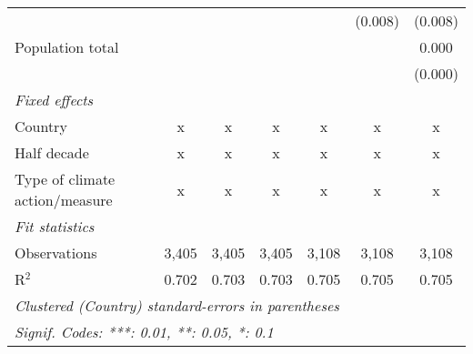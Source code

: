 \begin{tabular}{lcccccc}
                                                         &         &               &               &               & (0.008)       & (0.008)\\   
   Population total                                      &         &               &               &               &               & 0.000\\   
                                                         &         &               &               &               &               & (0.000)\\   
   \emph{Fixed effects}\\
   Country                                               & x       & x             & x             & x             & x             & x\\  
   Half decade                                           & x       & x             & x             & x             & x             & x\\  
   Type of climate action/measure                        & x       & x             & x             & x             & x             & x\\  
   \midrule \emph{Fit statistics}\\
   Observations                                          & 3,405   & 3,405         & 3,405         & 3,108         & 3,108         & 3,108\\  
   R$^2$                                                 & 0.702   & 0.703         & 0.703         & 0.705         & 0.705         & 0.705\\  
   \midrule
   \multicolumn{7}{l}{\emph{Clustered (Country) standard-errors in parentheses}}\\
   \multicolumn{7}{l}{\emph{Signif. Codes: ***: 0.01, **: 0.05, *: 0.1}}\\
\end{tabular}
\par\endgroup



